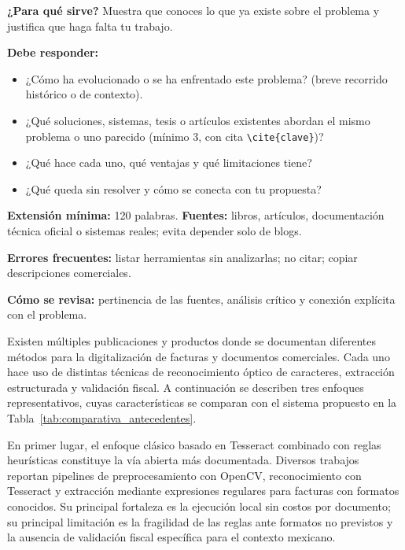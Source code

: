 \begin{guia}
\textbf{¿Para qué sirve?} Muestra que conoces lo que ya existe sobre el problema y justifica que haga falta tu trabajo.

\textbf{Debe responder:}
\begin{itemize}[nosep,leftmargin=*]
  \item ¿Cómo ha evolucionado o se ha enfrentado este problema? (breve recorrido histórico o de contexto).
  \item ¿Qué soluciones, sistemas, tesis o artículos existentes abordan el mismo problema o uno parecido (mínimo 3, con
        cita \verb|\cite{clave}|)?
  \item ¿Qué hace cada uno, qué ventajas y qué limitaciones tiene?
  \item ¿Qué queda sin resolver y cómo se conecta con tu propuesta?
\end{itemize}

\textbf{Extensión mínima:} 120 palabras. \textbf{Fuentes:} libros, artículos, documentación técnica oficial o sistemas
reales; evita depender solo de blogs.

\textbf{Errores frecuentes:} listar herramientas sin analizarlas; no citar; copiar descripciones comerciales.

\textbf{Cómo se revisa:} pertinencia de las fuentes, análisis crítico y conexión explícita con el problema.
\end{guia}

Existen múltiples publicaciones y productos donde se documentan diferentes métodos para la digitalización de facturas y documentos comerciales. Cada uno hace uso de distintas técnicas de reconocimiento óptico de caracteres, extracción estructurada y validación fiscal. A continuación se describen tres enfoques representativos, cuyas características se comparan con el sistema propuesto en la Tabla~\ref{tab:comparativa_antecedentes}.

En primer lugar, el enfoque clásico basado en Tesseract combinado con reglas heurísticas constituye la vía abierta más documentada. Diversos trabajos reportan pipelines de preprocesamiento con OpenCV, reconocimiento con Tesseract y extracción mediante expresiones regulares para facturas con formatos conocidos\cite{tesseract_ocr, opencv_docs}. Su principal fortaleza es la ejecución local sin costos por documento; su principal limitación es la fragilidad de las reglas ante formatos no previstos y la ausencia de validación fiscal específica para el contexto mexicano.

